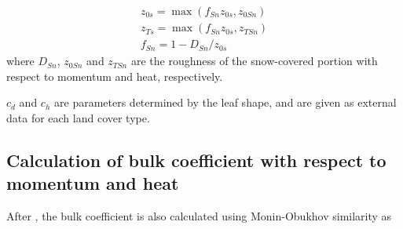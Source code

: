 \begin{eqnarray}
 z_{0s} = \max( f_{Sn} z_{0s}, z_{0Sn} ) \\
 z_{Ts} = \max( f_{Sn} z_{0s}, z_{TSn} ) \\
          f_{Sn} = 1 - D_{Sn} / z_{0s}
\end{eqnarray} where \(D_{Sn}\), \(z_{0Sn}\) and \(z_{TSn}\) are the roughness of the snow-covered portion with respect to momentum and heat, respectively.

\(c_d\) and \(c_h\) are parameters determined by the leaf shape, and are given as external data for each land cover type.

\subsection{Calculation of bulk coefficient with respect to momentum and heat}\label{calculation-of-bulk-coefficient-with-respect-to-momentum-and-heat}

After \citet{Watanabe1994-sx}, the bulk coefficient is also calculated using Monin-Obukhov similarity as

